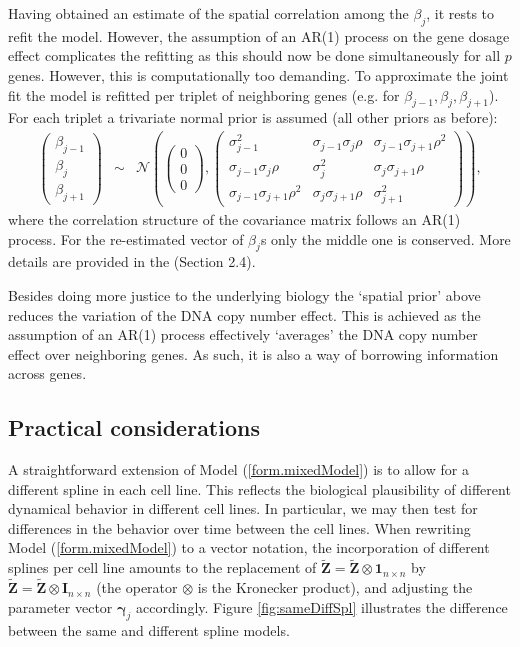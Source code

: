 Having obtained an estimate of the spatial correlation among the $\beta_j$, it rests to refit the model. However, the assumption of an AR(1) process on the gene dosage effect complicates the refitting as this should now be done simultaneously for all $p$ genes. However, this is computationally too demanding. To approximate the joint fit the model is refitted per triplet of neighboring genes (e.g. for $\beta_{j-1}, \beta_j, \beta_{j+1}$). For each triplet a trivariate normal prior is assumed (all other priors as before):
\begin{eqnarray*}
\left(
\begin{array}{l}
\beta_{j-1} \\ \beta_j \\ \beta_{j+1}
\end{array}
\right)
& \sim &
\mathcal{N} \left( \left(
\begin{array}{r}
0 \\ 0 \\ 0
\end{array}
\right), \left(
\begin{array}{lll}
\sigma_{j-1}^2          & \sigma_{j-1} \sigma_{j} \rho & \sigma_{j-1} \sigma_{j+1} \rho^2 \\
\sigma_{j-1} \sigma_{j} \rho     & \sigma_j^2      & \sigma_{j} \sigma_{j+1} \rho
\\
\sigma_{j-1} \sigma_{j+1} \rho^2 & \sigma_{j} \sigma_{j+1} \rho & \sigma_{j+1}^2
\end{array}
\right) \right),
\end{eqnarray*}
where the correlation structure of the covariance matrix follows an AR(1) process.
For the re-estimated vector of $\beta_j$s only the middle one is conserved. More details are provided in the \cite{Supp2018} (Section 2.4).

Besides doing more justice to the underlying biology the `spatial prior' above reduces the variation of the DNA copy number effect. This is achieved as the assumption of an AR(1) process effectively `averages' the DNA copy number effect over neighboring genes. As such, it is also a way of borrowing information across genes.


\subsection{Practical considerations}
\label{considerations}
A straightforward extension of Model (\ref{form.mixedModel}) is to allow for a different spline in each cell line. This reflects the biological plausibility of different dynamical behavior in different cell lines. In particular, we may then test for differences in the behavior over time between the cell lines. When rewriting Model (\ref{form.mixedModel}) to a vector notation, the incorporation of different splines per cell line amounts to the replacement of $\tilde{\textbf{Z}} = \tilde{\textbf{Z}}\otimes\boldsymbol{1}_{n\times n}$ by $\tilde{\textbf{Z}} = \tilde{\textbf{Z}} \otimes \mathbf{I}_{n\times n}$ (the operator $\otimes$ is the Kronecker product), and adjusting the parameter vector $\boldsymbol{\gamma}_j$ accordingly. Figure \ref{fig:sameDiffSpl} illustrates the difference between the same and different spline models.

